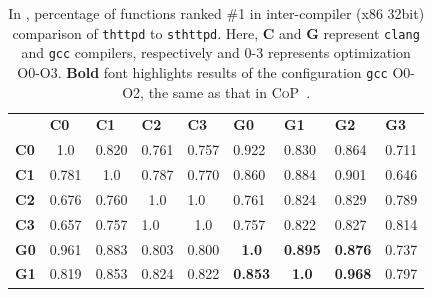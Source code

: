 \begin{table}[t]
\scriptsize
\centering
\caption{In \toolNew, percentage of functions ranked \#1 in inter-compiler (x86 32bit) comparison of \texttt{thttpd} to \texttt{sthttpd}. Here, \textbf{C} and \textbf{G} represent \texttt{clang} and \texttt{gcc} compilers, respectively and 0-3 represents optimization O0-O3. \textbf{Bold} font highlights results of the configuration \texttt{gcc} O0-O2, the same as that in \textsc{CoP}~\cite{luo2014semantics}.}
\label{tab:cross-code-inter1}
\begin{tabular}{@{}lllllllll@{}}
\textbf{} & \textbf{C0} & \textbf{C1} & \textbf{C2} & \textbf{C3} & \textbf{G0} & \textbf{G1} & \textbf{G2} & \textbf{G3} \\ \cmidrule(l){2-9}
\multicolumn{1}{l|}{\textbf{C0}} & \multicolumn{1}{c|}{1.0} & \multicolumn{1}{l|}{0.820} & \multicolumn{1}{l|}{0.761} & \multicolumn{1}{l|}{0.757} & \multicolumn{1}{l|}{0.922} & \multicolumn{1}{l|}{0.830} & \multicolumn{1}{l|}{0.864} & \multicolumn{1}{l|}{0.711} \\ \cmidrule(l){2-9}
\multicolumn{1}{l|}{\textbf{C1}} & \multicolumn{1}{l|}{0.781} & \multicolumn{1}{c|}{1.0} & \multicolumn{1}{l|}{0.787} & \multicolumn{1}{l|}{0.770} & \multicolumn{1}{l|}{0.860} & \multicolumn{1}{l|}{0.884} & \multicolumn{1}{l|}{0.901} & \multicolumn{1}{l|}{0.646} \\ \cmidrule(l){2-9}
\multicolumn{1}{l|}{\textbf{C2}} & \multicolumn{1}{l|}{0.676} & \multicolumn{1}{l|}{0.760} & \multicolumn{1}{c|}{ 1.0 } & \multicolumn{1}{l|}{ 1.0 } & \multicolumn{1}{l|}{ 0.761} & \multicolumn{1}{l|}{0.824} & \multicolumn{1}{l|}{0.829} & \multicolumn{1}{l|}{0.789} \\ \cmidrule(l){2-9}
\multicolumn{1}{l|}{\textbf{C3}} & \multicolumn{1}{l|}{0.657 } & \multicolumn{1}{l|}{0.757} & \multicolumn{1}{l|}{1.0} & \multicolumn{1}{c|}{1.0} & \multicolumn{1}{l|}{0.757} & \multicolumn{1}{l|}{0.822} & \multicolumn{1}{l|}{0.827 } & \multicolumn{1}{l|}{0.814 } \\ \cmidrule(l){2-9}
\multicolumn{1}{l|}{\textbf{G0}} & \multicolumn{1}{l|}{0.961} & \multicolumn{1}{l|}{0.883} & \multicolumn{1}{l|}{0.803} & \multicolumn{1}{l|}{0.800} & \multicolumn{1}{c|}{\textbf{1.0}} & \multicolumn{1}{l|}{\textbf{0.895}} & \multicolumn{1}{l|}{\textbf{0.876}} & \multicolumn{1}{l|}{0.737} \\ \cmidrule(l){2-9}
\multicolumn{1}{l|}{\textbf{G1}} & \multicolumn{1}{l|}{0.819} & \multicolumn{1}{l|}{0.853} & \multicolumn{1}{l|}{0.824} & \multicolumn{1}{l|}{0.822} & \multicolumn{1}{l|}{\textbf{0.853}} & \multicolumn{1}{c|}{\textbf{1.0}} & \multicolumn{1}{l|}{\textbf{0.968}} & \multicolumn{1}{l|}{0.797} \\ \cmidrule(l){2-9}

\end{tabular}
\end{table}
